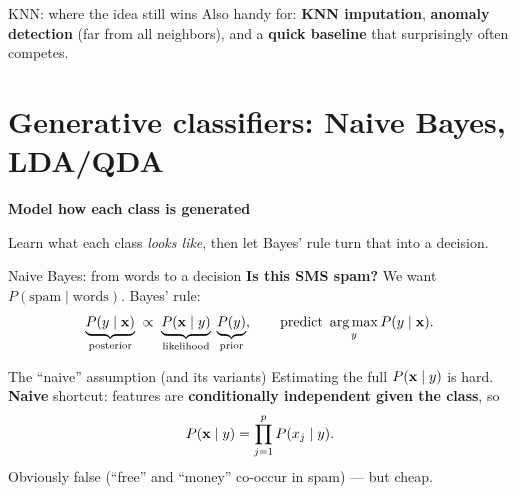 \documentclass[aspectratio=169]{beamer}
\newcommand{\sectiontransition}[2]{%
  \begin{frame}[plain]
    \vfill
    \begin{center}
      {\Large\color{popblue}\textbf{#1}}\\[0.9em]
      \begin{minipage}{0.82\textwidth}\centering\small #2 \end{minipage}
    \end{center}
    \vfill
  \end{frame}}
\begin{document}
\begin{frame}{KNN: where the idea still wins}
  \vfill
  Also handy for: \textbf{KNN imputation}, \textbf{anomaly detection} (far from all neighbors),
  and a \textbf{quick baseline} that surprisingly often competes.
\end{frame}

\section{Generative classifiers: Naive Bayes, LDA/QDA}
\sectiontransition{Model how each class is generated}{Learn what each class \emph{looks like},
then let Bayes' rule turn that into a decision.}

\begin{frame}{Naive Bayes: from words to a decision}
  \textbf{Is this SMS spam?} We want $P(\text{spam}\mid \text{words})$. Bayes' rule:
  \[
    \underbrace{P(y \mid \mathbf{x})}_{\text{posterior}} \;\propto\;
    \underbrace{P(\mathbf{x} \mid y)}_{\text{likelihood}}\;\underbrace{P(y)}_{\text{prior}},
    \qquad \text{predict } \mathop{\mathrm{arg\,max}}_y P(y \mid \mathbf{x}).
  \]
\end{frame}

\begin{frame}{The ``naive'' assumption (and its variants)}
  Estimating the full $P(\mathbf{x} \mid y)$ is hard. \textbf{Naive} shortcut: features are
  \textbf{conditionally independent given the class}, so
  \[
    P(\mathbf{x} \mid y) = \prod_{j=1}^{p} P(x_j \mid y).
  \]
  Obviously false (``free'' and ``money'' co-occur in spam) --- but cheap.
  \vfill
\end{frame}
\end{document}
